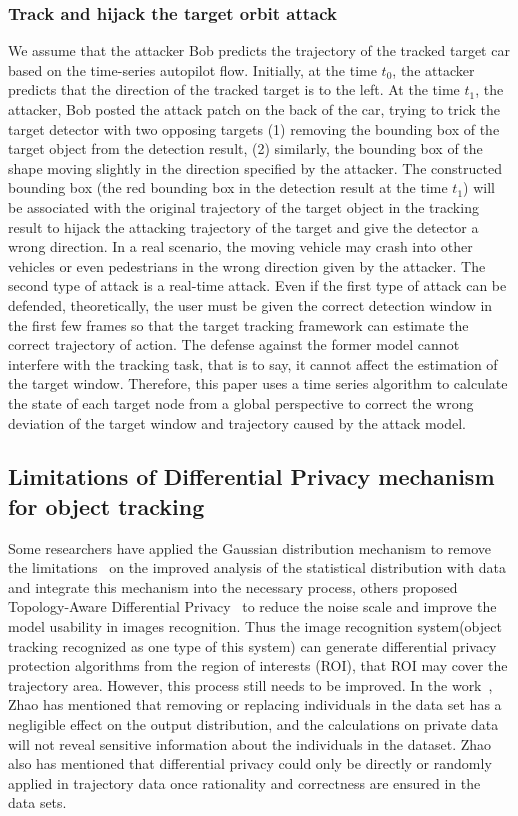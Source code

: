 \documentclass[trans]{IEEEtran}
\newcommand{\el}[1]{{\color{black}#1}}
\begin{document}
\subsubsection{Track and hijack the target orbit attack}
We assume that the attacker Bob predicts the trajectory of the tracked target car based on the time-series autopilot flow. Initially, at the time $t_0$, the attacker predicts that the direction of the tracked target is to the left. At the time $t_1$, the attacker, Bob posted the attack patch on the back of the car, trying to trick the target detector with two opposing targets (1) removing the bounding box of the target object from the detection result, (2) similarly, the bounding box of the shape moving slightly in the direction specified by the attacker. The constructed bounding box (the red bounding box in the detection result at the time $t_1$) will be associated with the original trajectory of the target object in the tracking result to hijack the attacking trajectory of the target and give the detector a wrong direction. In a real scenario, the moving vehicle may crash into other vehicles or even pedestrians in the wrong direction given by the attacker. The second type of attack is a real-time attack. Even if the first type of attack can be defended,  theoretically, the user must be given the correct detection window in the first few frames so that the target tracking framework can estimate the correct trajectory of action.  \el{ The defense against the former model cannot interfere with the tracking task, that is to say, it cannot affect the estimation of the target window. Therefore, this paper} uses a time series algorithm to calculate the state of each target node from a global perspective to correct the wrong deviation of the target window and trajectory caused by the attack model.


\subsection{Limitations of Differential Privacy mechanism for object tracking}
Some researchers have \el{ applied} the Gaussian distribution mechanism to remove the limitations~\cite{liu2018generalized} on the improved analysis of the statistical distribution with data and integrate this mechanism into the necessary process, others proposed Topology-Aware Differential Privacy~\cite{guo2021topology} to reduce the noise scale and improve the model usability in images recognition. Thus the image recognition system(object tracking recognized as one type of this system) can generate differential privacy protection algorithms from the region of interests (ROI), that ROI may cover the trajectory area. However, this process still needs to be improved. \el{ In the work~\cite{zhao2020novel}, Zhao has mentioned that removing or replacing individuals in the data set has a negligible effect on the output distribution, and the calculations on private data will not reveal sensitive information about the individuals in the dataset. Zhao also has} mentioned that differential privacy could only be directly or randomly applied in trajectory data once rationality and correctness are ensured in the data sets. 
\end{document}
